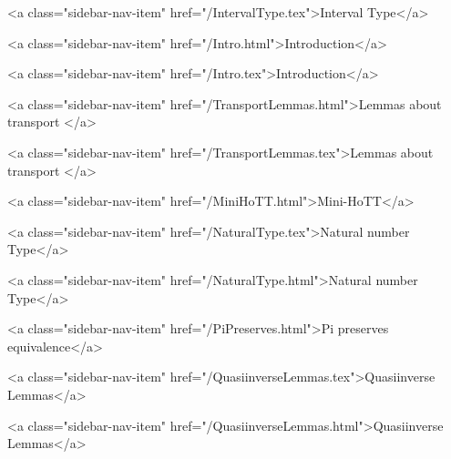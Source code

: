       
        
          <a class="sidebar-nav-item" href="/IntervalType.tex">Interval Type</a>
        
      
    
      
        
          <a class="sidebar-nav-item" href="/Intro.html">Introduction</a>
        
      
    
      
        
          <a class="sidebar-nav-item" href="/Intro.tex">Introduction</a>
        
      
    
      
        
          <a class="sidebar-nav-item" href="/TransportLemmas.html">Lemmas about transport </a>
        
      
    
      
        
          <a class="sidebar-nav-item" href="/TransportLemmas.tex">Lemmas about transport </a>
        
      
    
      
        
          <a class="sidebar-nav-item" href="/MiniHoTT.html">Mini-HoTT</a>
        
      
    
      
        
          <a class="sidebar-nav-item" href="/NaturalType.tex">Natural number Type</a>
        
      
    
      
        
          <a class="sidebar-nav-item" href="/NaturalType.html">Natural number Type</a>
        
      
    
      
        
          <a class="sidebar-nav-item" href="/PiPreserves.html">Pi preserves equivalence</a>
        
      
    
      
        
          <a class="sidebar-nav-item" href="/QuasiinverseLemmas.tex">Quasiinverse Lemmas</a>
        
      
    
      
        
          <a class="sidebar-nav-item" href="/QuasiinverseLemmas.html">Quasiinverse Lemmas</a>
        

